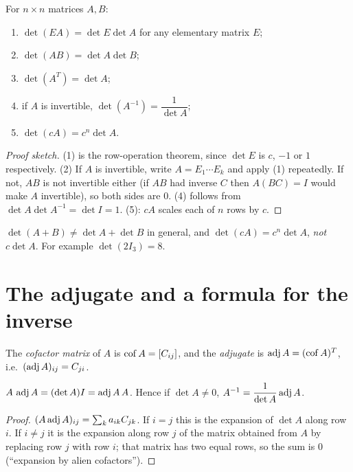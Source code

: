 \begin{theorem}
For $n\times n$ matrices $A,B$:
\begin{enumerate}
  \item $\det(EA)=\det E\det A$ for any elementary matrix $E$;
  \item $\det(AB)=\det A\det B$;
  \item $\det(A^T)=\det A$;
  \item if $A$ is invertible, $\det(A^{-1})=\dfrac{1}{\det A}$;
  \item $\det(cA)=c^n\det A$.
\end{enumerate}
\end{theorem}
\begin{proof}[Proof sketch]
(1) is the row-operation theorem, since $\det E$ is $c$, $-1$ or $1$ respectively. (2) If $A$ is invertible,
write $A=E_1\cdots E_k$ and apply (1) repeatedly. If not, $AB$ is not invertible either (if $AB$ had inverse
$C$ then $A(BC)=I$ would make $A$ invertible), so both sides are $0$. (4) follows from
$\det A\det A^{-1}=\det I=1$. (5): $cA$ scales each of $n$ rows by $c$.
\end{proof}

\begin{important}[Pitfall]
$\det(A+B)\neq\det A+\det B$ in general, and $\det(cA)=c^n\det A$, \emph{not} $c\det A$.
For example $\det(2I_3)=8$.
\end{important}

\section{The adjugate and a formula for the inverse}

\begin{definition}
The \emph{cofactor matrix} of $A$ is $\operatorname{cof} A=[C_{ij}]$, and the \emph{adjugate} is
$\operatorname{adj} A = (\operatorname{cof} A)^T$, i.e.\ $(\operatorname{adj} A)_{ij}=C_{ji}$.
\end{definition}

\begin{theorem}
$A\,\operatorname{adj} A=(\det A)I=\operatorname{adj} A\,A$. Hence if $\det A\ne0$, $A^{-1}=\dfrac{1}{\det A}\operatorname{adj} A$.
\end{theorem}
\begin{proof}
$(A\operatorname{adj} A)_{ij}=\sum_k a_{ik}C_{jk}$. If $i=j$ this is the expansion of $\det A$ along row $i$. If $i\ne j$ it is
the expansion along row $j$ of the matrix obtained from $A$ by replacing row $j$ with row $i$; that matrix has
two equal rows, so the sum is $0$ (``expansion by alien cofactors'').
\end{proof}

